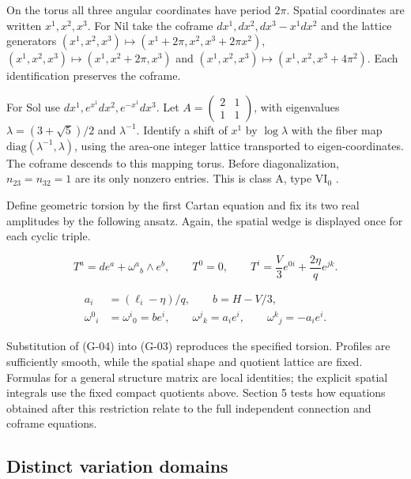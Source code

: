 On the torus all three angular coordinates have period $2\pi$. Spatial coordinates are written $x^1,x^2,x^3$. For Nil take the coframe $dx^1,dx^2,dx^3-x^1dx^2$ and the lattice generators $(x^1,x^2,x^3)\mapsto(x^1+2\pi,x^2,x^3+2\pi x^2)$, $(x^1,x^2,x^3)\mapsto(x^1,x^2+2\pi,x^3)$ and $(x^1,x^2,x^3)\mapsto(x^1,x^2,x^3+4\pi^2)$. Each identification preserves the coframe.

For Sol use $dx^1,e^{x^1}dx^2,e^{-x^1}dx^3$. Let $A=\left(\begin{smallmatrix}2&1\\1&1\end{smallmatrix}\right)$, with eigenvalues $\lambda=(3+\sqrt5)/2$ and $\lambda^{-1}$. Identify a shift of $x^1$ by $\log\lambda$ with the fiber map $\mathrm{diag}(\lambda^{-1},\lambda)$, using the area-one integer lattice transported to eigen-coordinates. The coframe descends to this mapping torus. Before diagonalization, $n_{23}=n_{32}=1$ are its only nonzero entries. This is class A, type VI$_0$ \cite{paper4}.

Define geometric torsion by the first Cartan equation and fix its two real amplitudes by the following ansatz. Again, the spatial wedge is displayed once for each cyclic triple.

\begin{equation}\tag{G-03}\label{eq:G-03}
T^a=de^a+\omega^a{}_{b}\wedge e^b,\qquad
T^0=0,\qquad T^i=\frac V3e^{0i}+\frac{2\eta}{q}e^{jk}.
\end{equation}

\begin{equation}\tag{G-04}\label{eq:G-04}
\begin{aligned}
a_i&=(\ell_i-\eta)/q,\qquad b=H-V/3,\\
\omega^0{}_{i}&=\omega^i{}_{0}=b e^i,\qquad
\omega^j{}_{k}=a_i e^i,\qquad \omega^k{}_{j}=-a_i e^i.
\end{aligned}
\end{equation}

Substitution of (G-04) into (G-03) reproduces the specified torsion. Profiles are sufficiently smooth, while the spatial shape and quotient lattice are fixed. Formulas for a general structure matrix are local identities; the explicit spatial integrals use the fixed compact quotients above. Section 5 tests how equations obtained after this restriction relate to the full independent connection and coframe equations.

\subsection{Distinct variation domains}

